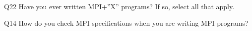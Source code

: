 \begin{description}%
\item{Q22} Have you ever written MPI+”X” programs? If so, select all that apply.%
\item{Q14} How do you check MPI specifications when you are writing MPI programs?%
\end{description}%
